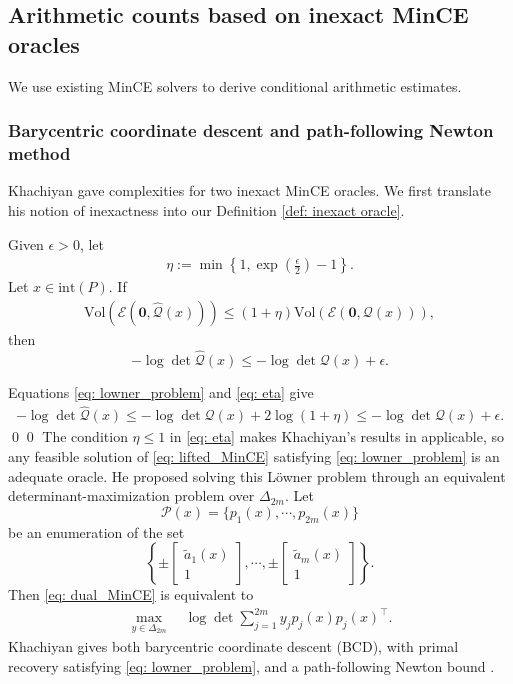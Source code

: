 \documentclass[smallextended]{svjour3}
\let\springerproof\proof
\let\endspringerproof\endproof
\renewenvironment{proof}{\springerproof}{%
  \ifhmode\qed\else\leavevmode\qed\fi\endspringerproof}
\newcommand{\E}{\mathcal{E}}
\newcommand{\Vol}{\mathrm{Vol}}
\newcommand{\wh}{\widehat}
\begin{document}
\subsection{Arithmetic counts based on inexact MinCE oracles}\label{subsec: arith}
We use existing MinCE solvers to derive conditional arithmetic estimates.
\subsubsection{Barycentric coordinate descent and path-following Newton method}\label{subsec: arith_khachiyan}
Khachiyan \cite{khachiyan1996rounding} gave complexities for two
inexact MinCE oracles. We first translate his notion of inexactness into our Definition \ref{def: inexact oracle}.

\begin{lemma}\label{lemma: lowner_to_obj_gap}
    Given $\epsilon >0$, let
    \begin{align}\label{eq: eta}
        \eta := \min \left \{1, \exp\left(\frac{\epsilon}{2}\right) - 1 \right \}.
    \end{align}
    Let $x \in \mathrm{int}(P)$. If
    \begin{align}\label{eq: lowner_problem}
        \Vol (\E(\mathbf{0}, \wh{\mathcal{Q}}(x)) )\leq (1  + \eta)  \Vol (\E(\mathbf{0}, \mathcal{Q}(x))),
    \end{align}
    then
     \[
        -\log \det \wh{\mathcal{Q}}(x)  \leq -\log \det \mathcal{Q}(x) + \epsilon.
    \]
\end{lemma}
\begin{proof}
Equations \eqref{eq: lowner_problem} and \eqref{eq: eta} give
\begin{align*}
    -\log \det \wh{\mathcal{Q}}(x) \leq -\log \det \mathcal{Q}(x) + 2\log(1 +\eta)\leq -\log \det \mathcal{Q}(x) + \epsilon.
\end{align*}
\end{proof}
The condition $\eta\leq1$ in \eqref{eq: eta} makes Khachiyan's results in
\cite{khachiyan1996rounding} applicable, so any feasible solution of \eqref{eq: lifted_MinCE} satisfying
\eqref{eq: lowner_problem} is an adequate oracle. He proposed solving this
L\"owner problem through an equivalent determinant-maximization problem over
$\Delta_{2m}$. Let
\[
    \mathcal{P}(x) = \{p_1(x),\cdots, p_{2m}(x)\}
\]
be an enumeration of the set
\[
    \left\{\pm \begin{bmatrix} \tilde{a}_1(x) \\1 \end{bmatrix}, \cdots, \pm \begin{bmatrix} \tilde{a}_m(x) \\1 \end{bmatrix} \right\}.
\]
Then \eqref{eq: dual_MinCE} is equivalent to
\begin{align}\label{eq: equivalent_dual_MinCE}
    \max_{y \in \Delta_{2m}} \quad \log \det  \sum_{j=1}^{2m} y_j p_j(x) p_j(x)^\top.
\end{align}
Khachiyan gives both barycentric coordinate descent (BCD), with primal recovery
satisfying \eqref{eq: lowner_problem}, and a path-following Newton bound
\cite{nesterov1989self,nesterov1994interior}.
\end{document}
